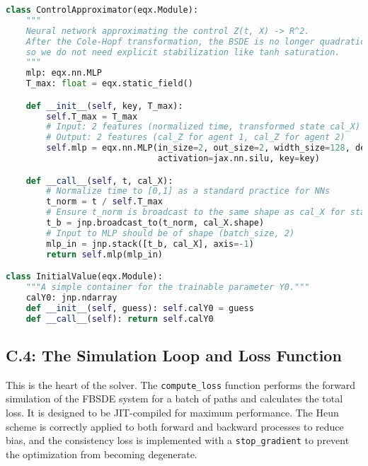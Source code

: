 \begin{lstlisting}[language=Python, caption={C.3: Equinox Modules for the Deep BSDE Solver (Post Cole-Hopf).}, label={lst:equinox_mlp_app_appendix}]
class ControlApproximator(eqx.Module):
    """
    Neural network approximating the control Z(t, X) -> R^2.
    After the Cole-Hopf transformation, the BSDE is no longer quadratic,
    so we do not need explicit stabilization like tanh saturation.
    """
    mlp: eqx.nn.MLP
    T_max: float = eqx.static_field()

    def __init__(self, key, T_max):
        self.T_max = T_max
        # Input: 2 features (normalized time, transformed state cal_X)
        # Output: 2 features (cal_Z for agent 1, cal_Z for agent 2)
        self.mlp = eqx.nn.MLP(in_size=2, out_size=2, width_size=128, depth=3, 
                              activation=jax.nn.silu, key=key)

    def __call__(self, t, cal_X):
        # Normalize time to [0,1] as a standard practice for NNs
        t_norm = t / self.T_max
        # Ensure t_norm is broadcast to the same shape as cal_X for stacking
        t_b = jnp.broadcast_to(t_norm, cal_X.shape)
        # Input to MLP should be of shape (batch_size, 2)
        mlp_in = jnp.stack([t_b, cal_X], axis=-1)
        return self.mlp(mlp_in)

class InitialValue(eqx.Module):
    """A simple container for the trainable parameter Y0."""
    calY0: jnp.ndarray
    def __init__(self, guess): self.calY0 = guess
    def __call__(self): return self.calY0
\end{lstlisting}

\subsection{C.4: The Simulation Loop and Loss Function}
This is the heart of the solver. The \texttt{compute\_loss} function performs the forward simulation of the FBSDE system for a batch of paths and calculates the total loss. It is designed to be JIT-compiled for maximum performance. The Heun scheme is correctly applied to both forward and backward processes to reduce bias, and the consistency loss is implemented with a \texttt{stop\_gradient} to prevent the optimization from becoming degenerate.

